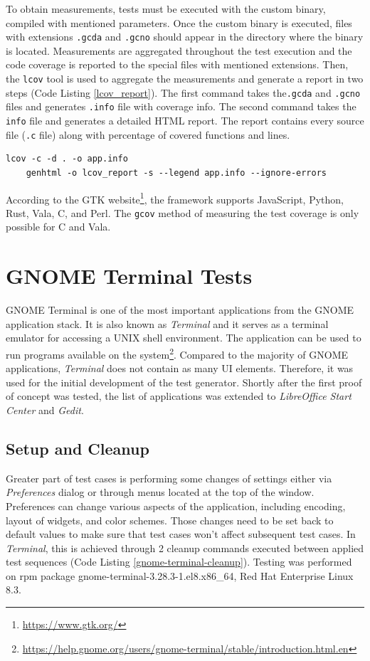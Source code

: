 To obtain measurements, tests must be executed with the custom binary, compiled with mentioned parameters. Once the custom binary is executed, files with extensions \texttt{.gcda} and \texttt{.gcno} should appear in the directory where the binary is located. Measurements are aggregated throughout the test execution and the code coverage is reported to the special files with mentioned extensions. Then, the \texttt{lcov} tool is used to aggregate the measurements and generate a report in two steps (Code Listing \ref{lcov_report}). The first command takes the\texttt{.gcda} and \texttt{.gcno} files and generates \texttt{.info} file with coverage info. The second command takes the \texttt{info} file and generates a detailed HTML report. The report contains every source file (\texttt{.c} file) along with percentage of covered functions and lines.

\begin{lstlisting}[language=Gherkin,caption={Shell commands used to generate an HTML report with \texttt{lcov} tool},label={lcov_report}]
    lcov -c -d . -o app.info
    genhtml -o lcov_report -s --legend app.info --ignore-errors
\end{lstlisting}


According to the GTK website\footnote{\url{https://www.gtk.org/}}, the framework supports JavaScript, Python, Rust, Vala, C, and Perl. The \verb|gcov| method of measuring the test coverage is only possible for C and Vala.    
\newpage
\section{GNOME Terminal Tests}
GNOME Terminal is one of the most important applications from the GNOME application stack. It is also known as \textit{Terminal} and it serves as a terminal emulator for accessing a UNIX shell environment. The application can be used to run programs available on the system\footnote{\url{https://help.gnome.org/users/gnome-terminal/stable/introduction.html.en}}. Compared to the majority of GNOME applications, \textit{Terminal} does not contain as many UI elements. Therefore, it was used for the initial development of the test generator. Shortly after the first proof of concept was tested, the list of applications was extended to \textit{LibreOffice Start Center} and \textit{Gedit}. 

\subsection{Setup and Cleanup}
Greater part of test cases is performing some changes of settings either via \textit{Preferences} dialog or through menus located at the top of the window. Preferences can change various aspects of the application, including encoding, layout of widgets, and color schemes. Those changes need to be set back to default values to make sure that test cases won't affect subsequent test cases. In \textit{Terminal}, this is achieved through 2 cleanup commands executed between applied test sequences (Code Listing \ref{gnome-terminal-cleanup}). Testing was performed on rpm package gnome-terminal-3.28.3-1.el8.x86\_64, Red Hat Enterprise Linux 8.3.

